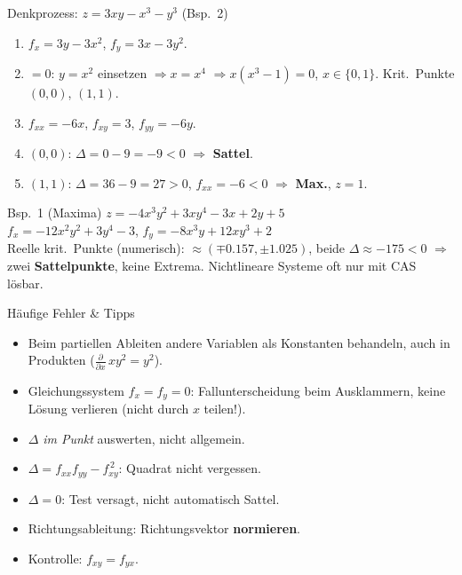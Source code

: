 \documentclass[a4paper, fontsize=7pt]{scrartcl}
\newcommand{\pdn}[2]{\frac{\partial #1}{\partial #2}}
\begin{document}
\begin{subbox}{Denkprozess: $z = 3xy - x^3 - y^3$ (Bsp.\ 2)}
\begin{enumerate}
    \item $f_x = 3y - 3x^2$, $f_y = 3x - 3y^2$.
    \item $= 0$: $y = x^2$ einsetzen $\Rightarrow x = x^4$
          $\Rightarrow x(x^3 - 1) = 0$, $x \in \{0, 1\}$.
          Krit.\ Punkte $(0, 0)$, $(1, 1)$.
    \item $f_{xx} = -6x$, $f_{xy} = 3$, $f_{yy} = -6y$.
    \item $(0, 0)$: $\Delta = 0 - 9 = -9 < 0$ $\Rightarrow$ \textbf{Sattel}.
    \item $(1, 1)$: $\Delta = 36 - 9 = 27 > 0$, $f_{xx} = -6 < 0$
          $\Rightarrow$ \textbf{Max.}, $z = 1$.
\end{enumerate}
\end{subbox}

\begin{subbox}{Bsp.\ 1 (Maxima)}
$z = -4x^3y^2 + 3xy^4 - 3x + 2y + 5$\\
$f_x = -12x^2y^2 + 3y^4 - 3$, $f_y = -8x^3y + 12xy^3 + 2$\\
Reelle krit.\ Punkte (numerisch): $\approx (\mp 0.157, \pm 1.025)$,
beide $\Delta \approx -175 < 0$ $\Rightarrow$ zwei \textbf{Sattelpunkte},
keine Extrema. Nichtlineare Systeme oft nur mit CAS lösbar.
\end{subbox}

\begin{subbox}{Häufige Fehler \& Tipps}
\begin{itemize}
    \item Beim partiellen Ableiten andere Variablen als Konstanten
          behandeln, auch in Produkten ($\pdn{}{x}\, x y^2 = y^2$).
    \item Gleichungssystem $f_x = f_y = 0$: Fallunterscheidung beim
          Ausklammern, keine Lösung verlieren (nicht durch $x$ teilen!).
    \item $\Delta$ \emph{im Punkt} auswerten, nicht allgemein.
    \item $\Delta = f_{xx} f_{yy} - f_{xy}^{\,2}$: Quadrat nicht vergessen.
    \item $\Delta = 0$: Test versagt, nicht automatisch Sattel.
    \item Richtungsableitung: Richtungsvektor \textbf{normieren}.
    \item Kontrolle: $f_{xy} = f_{yx}$.
\end{itemize}
\end{subbox}
\end{document}
